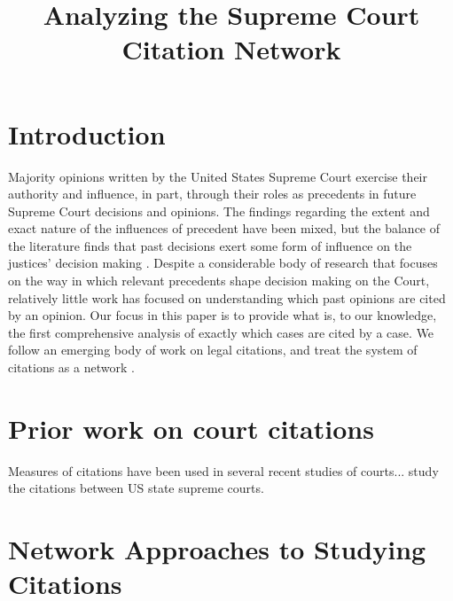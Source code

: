 \documentclass[headsepline=true, abstracton]{scrartcl}
\begin{document}
\renewcommand{\refname}{Bibliography}


\onehalfspacing
\setlength{\headsep}{15mm}


\thispagestyle{plain}

\title{\Large Analyzing the Supreme Court Citation Network}
\maketitle

\begin{abstract}
\noindent 
\end{abstract}


 \section{Introduction}
 
 
 
 
Majority opinions written by the United States Supreme Court exercise their authority and influence, in part, through their roles as precedents in future Supreme Court decisions and opinions. The findings regarding the extent and exact nature of the influences of precedent have been mixed, but the balance of the literature finds that past decisions exert some form of influence on the justices' decision making \citep{knight1996norm,gillman2001s,richards2002jurisprudential,hansford2006politics,bailey2008does,bailey2011constrained}. Despite a considerable body of research that focuses on the way in which relevant precedents shape decision making on the Court, relatively little work has focused on understanding which past opinions are cited by an opinion. Our focus in this paper is to provide what is, to our knowledge, the first comprehensive analysis of exactly which cases are cited by a case. We follow an emerging body of work on legal citations, and treat the system of citations as a network \citep[e.g., ][]{fowler2007network, fowler2008authority,bommarito2009law,lupu2012precedent,pelc2014politics}. 



\section{Prior work on court citations}

Measures of citations have been used in several recent studies of courts...\citet{hinkle2016transmission} study the citations between US state supreme courts.

\section{Network Approaches to Studying Citations}
\end{document}
